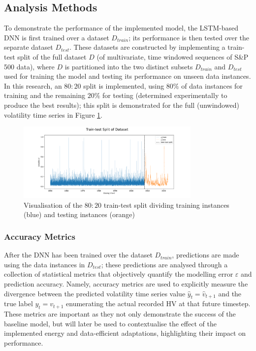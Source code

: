 \documentclass[a4paper, 11pt]{report}
\begin{document}
    \subsection{Analysis Methods}
    \label{section: metrics}

    To demonstrate the performance of the implemented model, the LSTM-based DNN is first trained over a dataset $D_{train}$; its performance is then tested over the separate dataset $D_{test}$. These datasets are constructed by implementing a train-test split of the full dataset $D$ (of multivariate, time windowed sequences of S\&P 500 data), where $D$ is partitioned into the two distinct subsets $D_{train}$ and $D_{test}$ used for training the model and testing its performance on unseen data instances. In this research, an $80 \colon 20$ split is implemented, using $80\%$ of data instances for training and the remaining $20\%$ for testing (determined experimentally to produce the best results); this split is demonstrated for the full (unwindowed) volatility time series in Figure \ref{fig: traintest-split}.


    \begin{figure}[ht]
        \label{fig: traintest-split}
        \centering
        \includegraphics[width=0.8\textwidth]{traintest-split.png}
        \caption{\centering Visualisation of the $80 \colon 20$ train-test split dividing training instances (blue) and testing instances (orange)}
    \end{figure}


    \subsubsection{Accuracy Metrics}

    After the DNN has been trained over the dataset $D_{train}$, predictions are made using the data instances in $D_{test}$; these predictions are analysed through a collection of statistical metrics that objectively quantify the modelling error $\varepsilon$ and prediction accuracy. Namely, accuracy metrics are used to explicitly measure the divergence between the predicted volatility time series value $\hat{y}_t = \hat{v}_{t+1}$ and the true label $y_t = v_{t+1}$ enumerating the actual recorded HV at that future timestep. These metrics are important as they not only demonstrate the success of the baseline model, but will later be used to contextualise the effect of the implemented energy and data-efficient adaptations, highlighting their impact on performance. 
\end{document}
